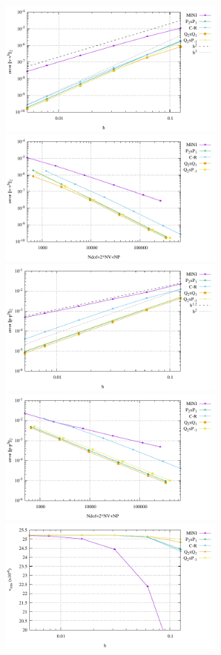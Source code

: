 \begin{center}
\includegraphics[width=8cm]{python_codes/fieldstone_112/results/exp4_rand/errors_V.pdf}
\includegraphics[width=8cm]{python_codes/fieldstone_112/results/exp4_rand/errors_V_ndof.pdf}\\
\includegraphics[width=8cm]{python_codes/fieldstone_112/results/exp4_rand/errors_P.pdf}
\includegraphics[width=8cm]{python_codes/fieldstone_112/results/exp4_rand/errors_P_ndof.pdf}\\
\includegraphics[width=8cm]{python_codes/fieldstone_112/results/exp4_rand/vrms.pdf}

\end{center}

